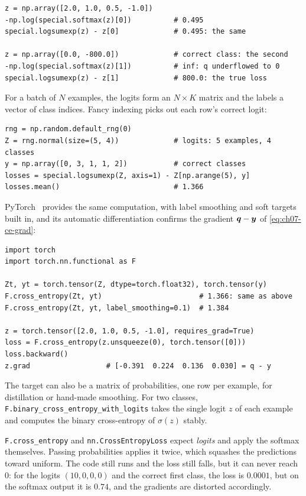 \begin{lstlisting}
z = np.array([2.0, 1.0, 0.5, -1.0])
-np.log(special.softmax(z)[0])          # 0.495
special.logsumexp(z) - z[0]             # 0.495: the same

z = np.array([0.0, -800.0])             # correct class: the second
-np.log(special.softmax(z)[1])          # inf: q underflowed to 0
special.logsumexp(z) - z[1]             # 800.0: the true loss
\end{lstlisting}

For a batch of $N$ examples, the logits form an $N \times K$ matrix and
the labels a vector of class indices. Fancy indexing picks out each row's
correct logit:

\begin{lstlisting}
rng = np.random.default_rng(0)
Z = rng.normal(size=(5, 4))             # logits: 5 examples, 4 classes
y = np.array([0, 3, 1, 1, 2])           # correct classes
losses = special.logsumexp(Z, axis=1) - Z[np.arange(5), y]
losses.mean()                           # 1.366
\end{lstlisting}

PyTorch~\cite{paszke2019pytorch} provides the same computation, with label
smoothing and soft targets built in, and its automatic differentiation
confirms the gradient $\bm{q} - \bm{y}$ of \cref{eq:ch07-ce-grad}:

\begin{lstlisting}
import torch
import torch.nn.functional as F

Zt, yt = torch.tensor(Z, dtype=torch.float32), torch.tensor(y)
F.cross_entropy(Zt, yt)                       # 1.366: same as above
F.cross_entropy(Zt, yt, label_smoothing=0.1)  # 1.384

z = torch.tensor([2.0, 1.0, 0.5, -1.0], requires_grad=True)
loss = F.cross_entropy(z.unsqueeze(0), torch.tensor([0]))
loss.backward()
z.grad                  # [-0.391  0.224  0.136  0.030] = q - y
\end{lstlisting}

The target can also be a matrix of probabilities, one row per example,
for distillation or hand-made smoothing. For two classes,
\texttt{F.binary\_cross\_entropy\_with\_logits} takes the single logit
$z$ of each example and computes the binary cross-entropy of
$\sigma(z)$ stably.

\begin{warning}
  \texttt{F.cross\_entropy} and \texttt{nn.CrossEntropyLoss} expect
  \emph{logits} and apply the softmax themselves. Passing probabilities
  applies it twice, which squashes the predictions toward uniform. The
  code still runs and the loss still falls, but it can never reach
  $0$: for the logits $(10, 0, 0, 0)$ and the correct first class, the
  loss is $0.0001$, but on the softmax output it is $0.74$, and the
  gradients are distorted accordingly.
\end{warning}

